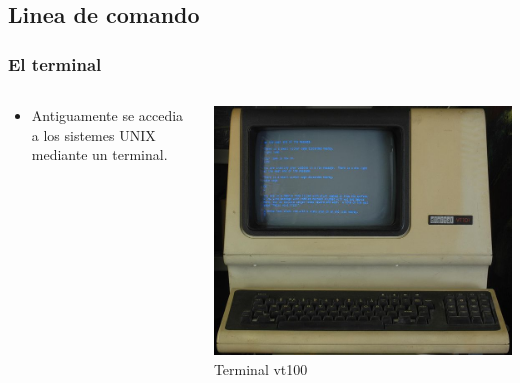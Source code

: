 \documentclass[colorlinks,10pt]{beamer}
\begin{document}
\subsection{Linea de comando}


\begin{frame}
  \frametitle{El terminal} 
  \begin{columns}
    \begin{column}{0.5\textwidth}
      \begin{itemize}
      \item Antiguamente  se accedia a los sistemes UNIX mediante un terminal.
      \end{itemize}
    \end{column}
    \begin{column}{0.5\textwidth}
      \begin{center}
        \includegraphics[width=1\textwidth]{figs/vt100}\\ 
        Terminal vt100 
      \end{center}        
    \end{column}
  \end{columns}

\end{frame}
\end{document}
